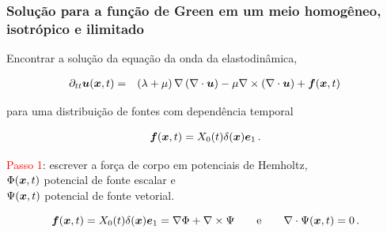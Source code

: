 \documentclass{beamer}
\newcommand{\xvec}{\vc{x}}
\newcommand{\evec}{\vc{e}}
\newcommand{\uvec}{\vc{u}}
\newcommand{\fvec}{\vc{f}}
\begin{document}
\begin{frame}
	\frametitle{\textbf{Solu\c{c}\~ao para a fun\c{c}\~ao de Green em um meio homog\^eneo, isotr\'opico e ilimitado}}
	
	\begin{flushleft}
		Encontrar a solu\c{c}\~ao da equa\c{c}\~ao da onda da elastodin\^amica, 
	\end{flushleft}
	\begin{eqnarray}
	\label{ten1}
	\partial_{tt}\uvec(\xvec,t) &=& \left(\lambda + \mu\right) \nabla \left(\nabla \cdot \uvec \right) - \mu\nabla \times \left(\nabla \cdot \uvec \right)  + \fvec(\xvec,t)\, 
	\end{eqnarray}
	\begin{flushleft}
		para uma distribui\c{c}\~ao de fontes com depend\^encia temporal
	\end{flushleft}
	\begin{equation}
	\label{ten1}
	\fvec(\xvec,t) = X_{0}(t)\delta(\xvec)\evec_1\, .
	\end{equation}
	\begin{flushleft}
		\textcolor{red}{Passo 1}:\hspace{0.025cm} escrever a for\c{c}a de corpo em potenciais de Hemholtz,\\
		$\Phi(\xvec,t)$ potencial de fonte escalar e \\
		$\Psi(\xvec,t)$ potencial de fonte vetorial.\\
	\end{flushleft}
	\begin{equation}
	\label{ten1}
	\fvec(\xvec,t) = X_{0}(t)\delta(\xvec)\evec_1 = \nabla \Phi + \nabla \times \Psi \quad\quad \mbox{e} \quad\quad    \nabla \cdot \Psi(\xvec,t) = 0 \, .
	\end{equation}
	
\end{frame}%
\end{document}

